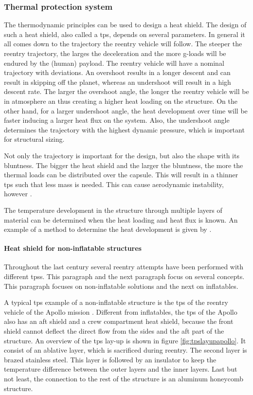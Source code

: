 \subsubsection{Thermal protection system}
The thermodynamic principles can be used to design a heat shield. The design of such a heat shield, also called a \acrfull{tps}, depends on several parameters. In general it all comes down to the trajectory the reentry vehicle will follow. The steeper the reentry trajectory, the larges the deceleration and the more g-loads will be endured by the (human) payload. The reentry vehicle will have a nominal trajectory with deviations. An overshoot results in a longer descent and can result in skipping off the planet, whereas an undershoot will result in a high descent rate. The larger the overshoot angle, the longer the reentry vehicle will be in atmosphere an thus creating a higher heat loading on the structure. On the other hand, for a larger undershoot angle, the heat development over time will be faster inducing a larger heat flux on the system. Also, the undershoot angle determines the trajectory with the highest dynamic pressure, which is important for structural sizing. 

Not only the trajectory is important for the design, but also the shape with its bluntness. The bigger the heat shield and the larger the bluntness, the more the  thermal loads can be distributed over the capsule. This will result in a thinner \gls{tps} such that less mass is needed. This can cause aerodynamic instability, however \cite{Smoot}.

The temperature development in the structure through multiple layers of material can be determined when the heat loading and heat flux is known. An example of a method to determine the heat development is given by \cite{Daryabeigi2002}.

\paragraph{Heat shield for non-inflatable structures}
Throughout the last century several reentry attempts have been performed with different \gls{tps}s. This paragraph and the next paragraph focus on several concepts. This paragraph focuses on non-inflatable solutions and the next on inflatables. 

A typical \gls{tps} example of a non-inflatable structure is the \gls{tps} of the reentry vehicle of the Apollo mission \cite{Pavlosky1974}. Different from inflatables, the \gls{tps} of the Apollo also has an aft shield and a crew compartment heat shield, because the front shield cannot deflect the direct flow from the sides and the aft part of the structure. An overview of the \gls{tps} lay-up is shown in figure \ref{fig:tpslayupapollo}. It consist of an ablative layer, which is sacrificed during reentry. The second layer is brazed stainless steel. This layer is followed by an insulator to keep the temperature difference between the outer layers and the inner layers. Last but not least, the connection to the rest of the structure is an aluminum honeycomb structure.

